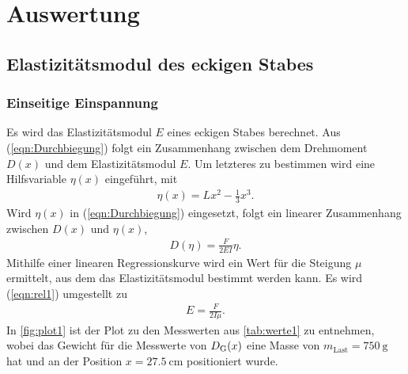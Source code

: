 \section{Auswertung}
\label{sec:Auswertung}

\subsection{Elastizitätsmodul des eckigen Stabes}
\label{subsec:elastiEckig}

\subsubsection{Einseitige Einspannung}
\label{subsubsec:einsEck}
Es wird das Elastizitätsmodul $E$ eines eckigen Stabes berechnet.
Aus (\ref{eqn:Durchbiegung}) folgt ein Zusammenhang zwischen dem Drehmoment $D(x)$ und dem Elastizitätsmodul $E$. Um letzteres zu bestimmen
wird eine Hilfsvariable $\eta(x)$ eingeführt, mit 
\begin{align*}
  \eta(x) = Lx^2- \frac 13 x^3.
\end{align*}
Wird $\eta(x)$ in (\ref{eqn:Durchbiegung}) eingesetzt, folgt ein linearer Zusammenhang zwischen $D(x)$ und $\eta(x)$,
\begin{align}
  D(\eta) = \frac{F}{2EI}\eta.
  \label{eqn:rel1}
\end{align}
Mithilfe einer linearen Regressionskurve wird ein Wert für die Steigung $\mu$ ermittelt, aus dem das Elastizitätsmodul bestimmt
werden kann. Es wird (\ref{eqn:rel1}) umgestellt zu
\begin{align}
  E = \frac{F}{2I\mu}.
  \label{eqn:linRegq}
\end{align}
In \autoref{fig:plot1} ist der Plot zu den Messwerten 
aus \autoref{tab:werte1} zu entnehmen, wobei das Gewicht für die Messwerte von $D_{\text G}(x)$ eine Masse von 
$m_{\text{Last}}=\SI{750}{\gram}$ hat und an der Position $x = \SI{27.5}{\centi\meter}$ positioniert wurde.  


